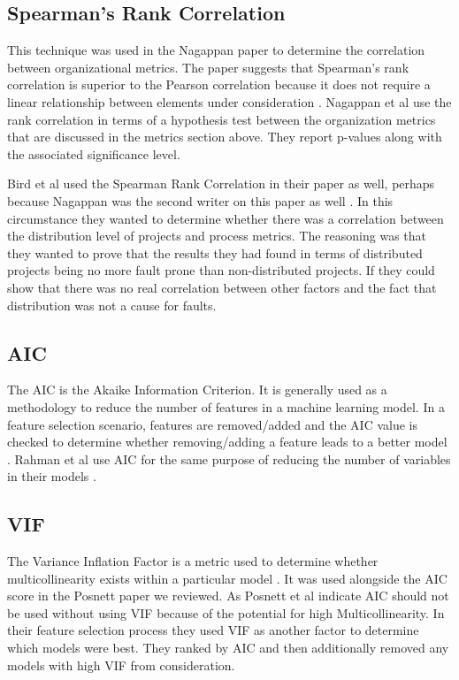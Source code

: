 \documentclass{sig-alternate-05-2015}
\begin{document}
\subsection{Spearman's Rank Correlation}
This technique was used in the Nagappan paper to determine the correlation between organizational metrics.  The paper suggests that Spearman's rank correlation is superior to the Pearson correlation because it does not require a linear relationship between elements under consideration \cite{Nagappan}.  Nagappan et al use the rank correlation in terms of a hypothesis test between the organization metrics that are discussed in the metrics section above.  They report p-values along with the associated significance level.

Bird et al used the Spearman Rank Correlation in their paper as well, perhaps because Nagappan was the second writer on this paper as well \cite{Bird}.  In this circumstance they wanted to determine whether there was a correlation between the distribution level of projects and process metrics.  The reasoning was that they wanted to prove that the results they had found in terms of distributed projects being no more fault prone than non-distributed projects.  If they could show that there was no real correlation between other factors and the fact that distribution was not a cause for faults.

\subsection{AIC}
The AIC is the Akaike Information Criterion.  It is generally used as a methodology to reduce the number of features in a machine learning model.  In a feature selection scenario, features are removed/added and the AIC value is checked to determine whether removing/adding a feature leads to a better model \cite{James}.  Rahman et al use AIC for the same purpose of reducing the number of variables in their models \cite{Rahman}.

\subsection{VIF}
The Variance Inflation Factor is a metric used to determine whether multicollinearity exists within a particular model \cite{James}.  It was used alongside the AIC score in the Posnett paper we reviewed.  As Posnett et al indicate AIC should not be used without using VIF because of the potential for high Multicollinearity.  In their feature selection process they used VIF as another factor to determine which models were best.  They ranked by AIC and then additionally removed any models with high VIF from consideration.
\end{document}
